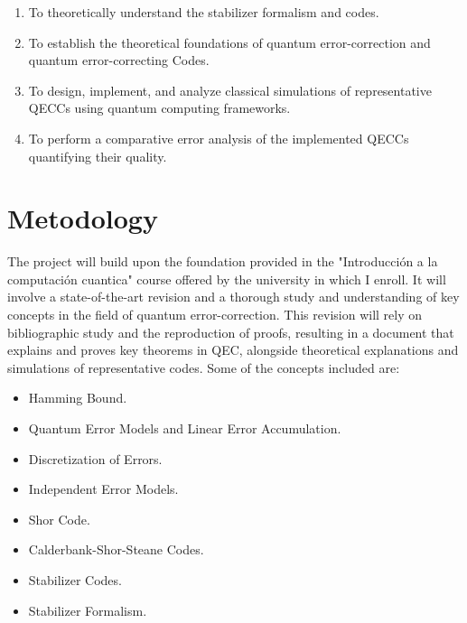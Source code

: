 \documentclass[12pt]{article}
\begin{document}

\begin{enumerate}
  \item To theoretically understand the stabilizer formalism and codes.
  \item To establish the theoretical foundations of quantum error-correction and quantum error-correcting Codes.
  \item To design, implement, and analyze classical simulations of representative QECCs using quantum computing frameworks.
  \item To perform a comparative error analysis of the implemented QECCs quantifying their quality.
\end{enumerate}

\section{Metodology}



The project will build upon the foundation provided in the "Introducci\'on a la computaci\'on cuantica" course offered by the university in which I enroll. It will involve a state-of-the-art revision and a thorough study and understanding of key concepts in the field of quantum error-correction. This revision will rely on bibliographic study and the reproduction of proofs, resulting in a document that explains and proves key theorems in QEC, alongside theoretical explanations and simulations of representative codes. Some of the concepts included are:

\begin{itemize}
\item Hamming Bound.
\item Quantum Error Models and Linear Error Accumulation.
\item Discretization of Errors.
\item Independent Error Models.
\item Shor Code.
\item Calderbank-Shor-Steane Codes.
\item Stabilizer Codes.
\item Stabilizer Formalism.
\end{itemize}
\end{document}
